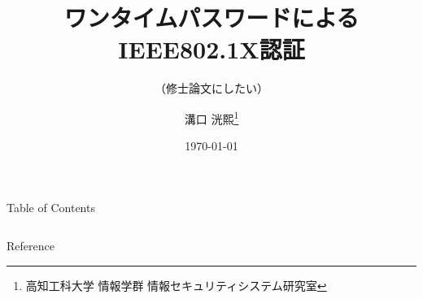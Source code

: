 \documentclass[aspectratio=43]{beamer}
\title{ワンタイムパスワードによるIEEE802.1X認証}
\subtitle{（修士論文にしたい）}
\author[K.MIZOGUCHI]{溝口 洸熙\thanks{高知工科大学 情報学群 情報セキュリティシステム研究室}}
\date{\today}
\newcommand{\stoc}{1}
\newcommand{\ftoc}{2}
\begin{document}
\maketitle

\begin{frame}[t]{Table of Contents}
    \begin{columns}[t]
        \begin{column}{.48\textwidth}
            \tableofcontents[sections=\stoc]
        \end{column}
        \begin{column}{.48\textwidth}
            \tableofcontents[sections=\ftoc]
        \end{column}
    \end{columns}
\end{frame}




\begin{frame}[allowframebreaks]{Reference}
    \printbibliography
\end{frame}
\end{document}
